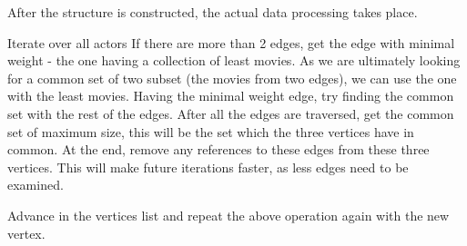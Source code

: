 After the structure is constructed, the actual data processing takes place.

Iterate over all actors
If there are more than 2 edges, get the edge with minimal weight - the one having a collection of least movies. As we are ultimately looking for a common set of two subset (the movies from two edges), we can use the one with the least movies.
Having the minimal weight edge, try finding the common set with the rest of the edges. After all the edges are traversed, get the common set of maximum size, this will be the set which the three vertices have in common. At the end, remove any references to these edges from these three vertices. This will make future iterations faster, as less edges need to be examined.

Advance in the vertices list and repeat the above operation again with the new vertex.